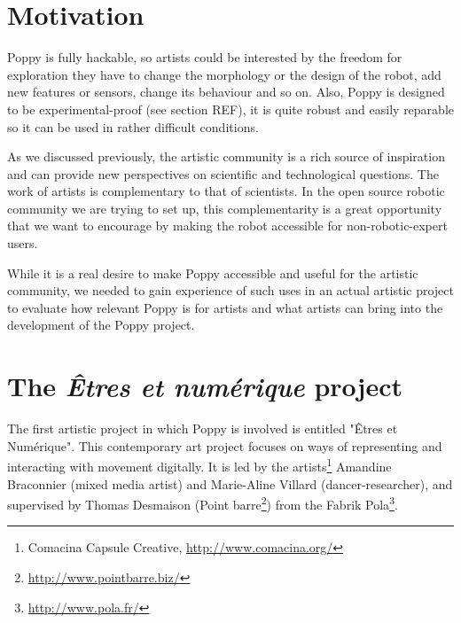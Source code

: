 \begin{figure}[tb]
\centering
    \hfil
    \caption{}
    \label{fig:robot_emotion_cinema}
\end{figure}


\section{Motivation } %
\label{sec:motivation}

Poppy is fully hackable, so artists could be interested by the freedom for exploration they have to change the morphology or the design of the robot, add new features or sensors, change its behaviour and so on. Also, Poppy is designed to be experimental-proof (see section REF), it is quite robust and easily reparable so it can be used in rather difficult conditions.

As we discussed previously, the artistic community is a rich source of inspiration and can provide new perspectives on scientific and technological questions. The work of artists is complementary to that of scientists. In the open source robotic community we are trying to set up, this complementarity is a great opportunity that we want to encourage by making the robot accessible for non-robotic-expert users.

While it is a real desire to make Poppy accessible and useful for the artistic community, we needed to gain experience of such uses in an actual artistic project to evaluate how relevant Poppy is for artists and what artists can bring into the development of the Poppy project.


\section{The \emph{Êtres et numérique} project} %

The first artistic project in which Poppy is involved is entitled "Êtres et Numérique". This contemporary art project focuses on ways of representing and interacting with movement digitally. It is led by the artists\footnote{Comacina Capsule Creative, \url{http://www.comacina.org/}} Amandine Braconnier (mixed media artist) and Marie-Aline Villard (dancer-researcher), and supervised by Thomas Desmaison (Point barre\footnote{\url{http://www.pointbarre.biz/}}) from the Fabrik Pola\footnote{\url{http://www.pola.fr/}}.

